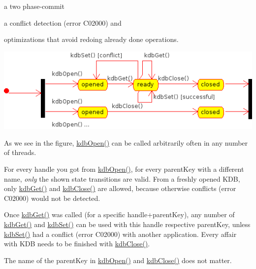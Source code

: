 \begin{DoxyItemize}
\item a two phase-\/commit
\item a conflict detection (error C02000) and
\item optimizations that avoid redoing already done operations.
\end{DoxyItemize}


\begin{DoxyImage}
\includegraphics[width=\textwidth,height=\textheight/2,keepaspectratio=true]{state.png}
\end{DoxyImage}
 As we see in the figure, \hyperlink{group__kdb_ga6808defe5870f328dd17910aacbdc6ca}{kdb\+Open()} can be called arbitrarily often in any number of threads.

For every handle you got from \hyperlink{group__kdb_ga6808defe5870f328dd17910aacbdc6ca}{kdb\+Open()}, for every parent\+Key with a different name, {\itshape only} the shown state transitions are valid. From a freshly opened K\+DB, only \hyperlink{group__kdb_ga28e385fd9cb7ccfe0b2f1ed2f62453a1}{kdb\+Get()} and \hyperlink{group__kdb_gadb54dc9fda17ee07deb9444df745c96f}{kdb\+Close()} are allowed, because otherwise conflicts (error C02000) would not be detected.

Once \hyperlink{group__kdb_ga28e385fd9cb7ccfe0b2f1ed2f62453a1}{kdb\+Get()} was called (for a specific handle+parent\+Key), any number of \hyperlink{group__kdb_ga28e385fd9cb7ccfe0b2f1ed2f62453a1}{kdb\+Get()} and \hyperlink{group__kdb_ga11436b058408f83d303ca5e996832bcf}{kdb\+Set()} can be used with this handle respective parent\+Key, unless \hyperlink{group__kdb_ga11436b058408f83d303ca5e996832bcf}{kdb\+Set()} had a conflict (error C02000) with another application. Every affair with K\+DB needs to be finished with \hyperlink{group__kdb_gadb54dc9fda17ee07deb9444df745c96f}{kdb\+Close()}.

The name of the parent\+Key in \hyperlink{group__kdb_ga6808defe5870f328dd17910aacbdc6ca}{kdb\+Open()} and \hyperlink{group__kdb_gadb54dc9fda17ee07deb9444df745c96f}{kdb\+Close()} does not matter.

